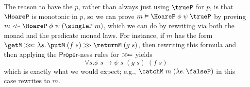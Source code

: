 \documentclass[preprint]{sigplanconf}
\begin{document}
The reason to have the $p$, rather than always just using $\trueP$ for $p$, is
that $\HoareP$ is monotonic in $p$, so we can prove
$m\vDash\HoareP\;\phi\;\psi\;\trueP$ by proving
$m\lrleq\HoareP\;\phi\;\psi\;(\singleP\;m)$, which we can do by rewriting via
both the monad and the predicate monad laws. For instance, if $m$ has the form
$\getM\bind\lamabsnot{s}{\putM\;(f\;s)\bindU\returnM\;(g\;s)}$, then rewriting
this formula and then applying the $\mathsf{Proper}$-ness rules for $>\!\!>\!\!=$
yields
\[
\forall s.\phi\;s \to \psi\;s\;(g\;s)\;(f\;s)
\]
which is exactly what we would expect; e.g.,
$\catchM\;m\;(\lamabsnot{e}{\falseP})$ in this case rewrites to $m$.





\end{document}
